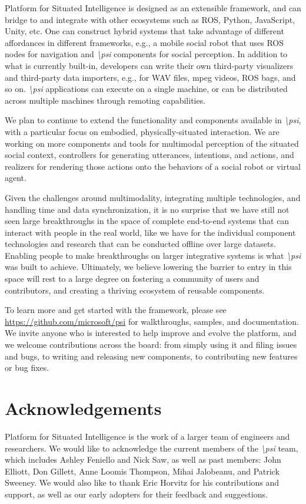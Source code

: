 \documentclass[letterpaper]{article} %
\newcommand{\psif}{\emph{\textbackslash psi} }
\newcommand{\psifnospace}{\emph{\textbackslash psi}}
\begin{document}
Platform for Situated Intelligence is designed as an extensible framework, and can bridge to and integrate with other ecosystems such as ROS, Python, JavaScript, Unity, etc. One can construct hybrid systems that take advantage of different affordances in different frameworks, e.g., a mobile social robot that uses ROS nodes for navigation and \psif components for social perception. In addition to what is currently built-in, developers can write their own third-party visualizers and third-party data importers, e.g., for WAV files, mpeg videos, ROS bags, and so on. \psif applications can execute on a single machine, or can be distributed across multiple machines through remoting capabilities.


We plan to continue to extend the functionality and components available in \psifnospace, with a particular focus on embodied, physically-situated interaction. We are working on more components and tools for multimodal perception of the situated social context, controllers for generating utterances, intentions, and actions, and realizers for rendering those actions onto the behaviors of a social robot or virtual agent.

Given the challenges around multimodality, integrating multiple technologies, and handling time and data synchronization, it is no surprise that we have still not seen large breakthroughs in the space of complete end-to-end systems that can interact with people in the real world, like we have for the individual component technologies and research that can be conducted offline over large datasets. Enabling people to make breakthroughs on larger integrative systems is what \psif was built to achieve. Ultimately, we believe lowering the barrier to entry in this space will rest to a large degree on fostering a community of users and contributors, and creating a thriving ecosystem of reusable components. 

To learn more and get started with the framework, please see \textcolor{blue}{\url{https://github.com/microsoft/psi}} for walkthroughs, samples, and documentation. We invite anyone who is interested to help improve and evolve the platform, and we welcome contributions across the board: from simply using it and filing issues and bugs, to writing and releasing new components, to contributing new features or bug fixes.

\section{Acknowledgements}
Platform for Situated Intelligence is the work of a larger team of engineers and researchers. We would like to acknowledge the current members of the \psif team, which includes Ashley Feniello and Nick Saw, as well as past members: John Elliott, Don Gillett, Anne Loomis Thompson, Mihai Jalobeanu, and Patrick Sweeney. We would also like to thank Eric Horvitz for his contributions and support, as well as our early adopters for their feedback and suggestions.



\end{document}
